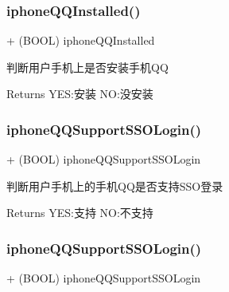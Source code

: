 \subsubsection{\texorpdfstring{iphone\+Q\+Q\+Installed()}{iphoneQQInstalled()}\hspace{0.1cm}{\footnotesize\ttfamily [2/2]}}
{\footnotesize\ttfamily + (B\+O\+OL) iphone\+Q\+Q\+Installed \begin{DoxyParamCaption}{ }\end{DoxyParamCaption}}

判断用户手机上是否安装手机\+QQ \begin{DoxyReturn}{Returns}
Y\+ES\+:安装 NO\+:没安装 
\end{DoxyReturn}
\mbox{\label{interface_tencent_o_auth_a7b5a02acedd8dc2b33135cfb863c2828}} 
\subsubsection{\texorpdfstring{iphone\+Q\+Q\+Support\+S\+S\+O\+Login()}{iphoneQQSupportSSOLogin()}\hspace{0.1cm}{\footnotesize\ttfamily [1/2]}}
{\footnotesize\ttfamily + (B\+O\+OL) iphone\+Q\+Q\+Support\+S\+S\+O\+Login \begin{DoxyParamCaption}{ }\end{DoxyParamCaption}}

判断用户手机上的手机\+Q\+Q是否支持\+S\+S\+O登录 \begin{DoxyReturn}{Returns}
Y\+ES\+:支持 NO\+:不支持 
\end{DoxyReturn}
\mbox{\label{interface_tencent_o_auth_a7b5a02acedd8dc2b33135cfb863c2828}} 
\subsubsection{\texorpdfstring{iphone\+Q\+Q\+Support\+S\+S\+O\+Login()}{iphoneQQSupportSSOLogin()}\hspace{0.1cm}{\footnotesize\ttfamily [2/2]}}
{\footnotesize\ttfamily + (B\+O\+OL) iphone\+Q\+Q\+Support\+S\+S\+O\+Login \begin{DoxyParamCaption}{ }\end{DoxyParamCaption}}

